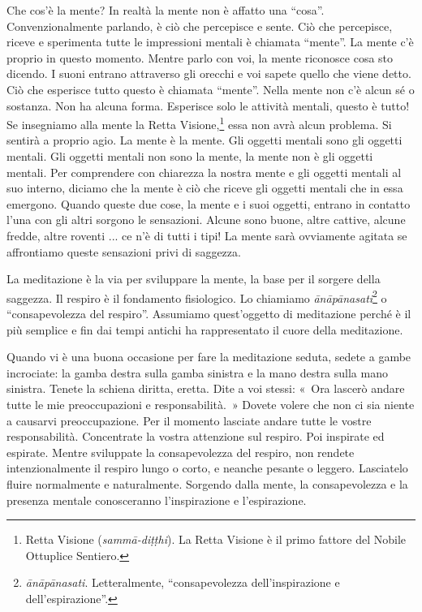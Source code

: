 Che cos'è la mente? In realtà la mente non è affatto una ``cosa''.
Convenzionalmente parlando, è ciò che percepisce e sente. Ciò che
percepisce, riceve e sperimenta tutte le impressioni mentali è chiamata
``mente''. La mente c'è proprio in questo momento. Mentre parlo con voi,
la mente riconosce cosa sto dicendo. I suoni entrano attraverso gli
orecchi e voi sapete quello che viene detto. Ciò che esperisce tutto
questo è chiamata ``mente''. Nella mente non c'è alcun sé o sostanza.
Non ha alcuna forma. Esperisce solo le attività mentali, questo è tutto!
Se insegniamo alla mente la Retta Visione,\footnote{Retta Visione
  (\emph{sammā-diṭṭhi}). La Retta Visione è il primo fattore del Nobile
  Ottuplice Sentiero.} essa non avrà alcun problema. Si sentirà a
proprio agio. La mente è la mente. Gli oggetti mentali sono gli oggetti
mentali. Gli oggetti mentali non sono la mente, la mente non è gli
oggetti mentali. Per comprendere con chiarezza la nostra mente e gli
oggetti mentali al suo interno, diciamo che la mente è ciò che riceve
gli oggetti mentali che in essa emergono. Quando queste due cose, la
mente e i suoi oggetti, entrano in contatto l'una con gli altri sorgono
le sensazioni. Alcune sono buone, altre cattive, alcune fredde, altre
roventi ... ce n'è di tutti i tipi! La mente sarà ovviamente agitata se
affrontiamo queste sensazioni privi di saggezza.

La meditazione è la via per sviluppare la mente, la base per il sorgere
della saggezza. Il respiro è il fondamento fisiologico. Lo chiamiamo
\emph{ānāpānasati}\footnote{\emph{ānāpānasati}. Letteralmente,
  ``consapevolezza dell'inspirazione e dell'espirazione''.} o
``consapevolezza del respiro''. Assumiamo quest'oggetto di meditazione
perché è il più semplice e fin dai tempi antichi ha rappresentato il
cuore della meditazione.

Quando vi è una buona occasione per fare la meditazione seduta, sedete a
gambe incrociate: la gamba destra sulla gamba sinistra e la mano destra
sulla mano sinistra. Tenete la schiena diritta, eretta. Dite a voi
stessi: «~Ora lascerò andare tutte le mie preoccupazioni e
responsabilità.~» Dovete volere che non ci sia niente a causarvi
preoccupazione. Per il momento lasciate andare tutte le vostre
responsabilità. Concentrate la vostra attenzione sul respiro. Poi
inspirate ed espirate. Mentre sviluppate la consapevolezza del respiro,
non rendete intenzionalmente il respiro lungo o corto, e neanche pesante
o leggero. Lasciatelo fluire normalmente e naturalmente. Sorgendo dalla
mente, la consapevolezza e la presenza mentale conosceranno
l'inspirazione e l'espirazione.

